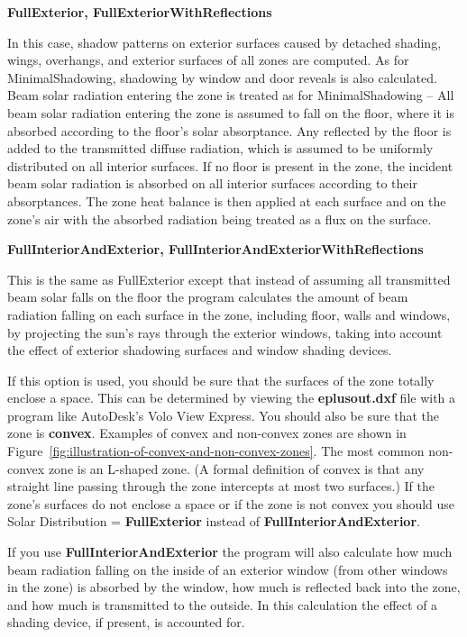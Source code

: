 \textbf{FullExterior, FullExteriorWithReflections}

In this case, shadow patterns on exterior surfaces caused by detached shading, wings, overhangs, and exterior surfaces of all zones are computed. As for MinimalShadowing, shadowing by window and door reveals is also calculated. Beam solar radiation entering the zone is treated as for MinimalShadowing -- All beam solar radiation entering the zone is assumed to fall on the floor, where it is absorbed according to the floor's solar absorptance. Any reflected by the floor is added to the transmitted diffuse radiation, which is assumed to be uniformly distributed on all interior surfaces. If no floor is present in the zone, the incident beam solar radiation is absorbed on all interior surfaces according to their absorptances. The zone heat balance is then applied at each surface and on the zone's air with the absorbed radiation being treated as a flux on the surface.

\textbf{FullInteriorAndExterior, FullInteriorAndExteriorWithReflections}

This is the same as FullExterior except that instead of assuming all transmitted beam solar falls on the floor the program calculates the amount of beam radiation falling on each surface in the zone, including floor, walls and windows, by projecting the sun's rays through the exterior windows, taking into account the effect of exterior shadowing surfaces and window shading devices.

If this option is used, you should be sure that the surfaces of the zone totally enclose a space. This can be determined by viewing the \textbf{eplusout.dxf} file with a program like AutoDesk's Volo View Express. You should also be sure that the zone is \textbf{convex}. Examples of convex and non-convex zones are shown in Figure~\ref{fig:illustration-of-convex-and-non-convex-zones}. The most common non-convex zone is an L-shaped zone. (A formal definition of convex is that any straight line passing through the zone intercepts at most two surfaces.) If the zone's surfaces do not enclose a space or if the zone is not convex you should use Solar Distribution = \textbf{FullExterior} instead of \textbf{FullInteriorAndExterior}.

If you use \textbf{FullInteriorAndExterior} the program will also calculate how much beam radiation falling on the inside of an exterior window (from other windows in the zone) is absorbed by the window, how much is reflected back into the zone, and how much is transmitted to the outside. In this calculation the effect of a shading device, if present, is accounted for.

